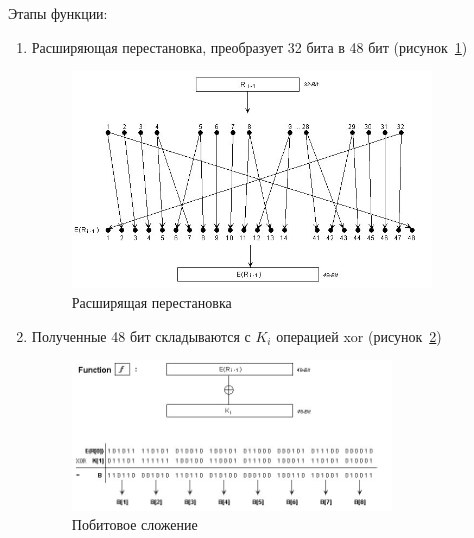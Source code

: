 \documentclass[a4paper, 14pt]{extarticle}
\begin{document}
Этапы функции:
\begin{enumerate}
    \item Расширяющая перестановка, преобразует 32 бита в 48 бит (рисунок~\ref{img:1:3})
        \begin{figure}[h]
            \centering
            \includegraphics[width=0.9\textwidth]{./img/S003.jpg}
            \caption{Расширящая перестановка}%
            \label{img:1:3}
        \end{figure}
    \item Полученные 48 бит складываются с $K_i$ операцией xor (рисунок~\ref{img:1:3_1})
        \begin{figure}[h]
            \centering
            \includegraphics[width=0.8\textwidth]{./img/S007.jpg}
            \caption{Побитовое сложение}%
            \label{img:1:3_1}
        \end{figure}
        

\end{enumerate}
\end{document}
